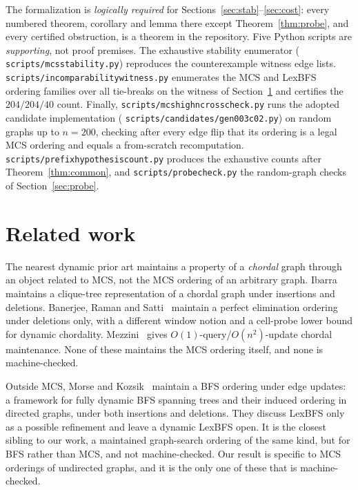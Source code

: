 \documentclass[11pt]{article}
\theoremstyle{definition}
\theoremstyle{remark}
\newcommand{\leanname}[1]{%
  \texttt{\begingroup\def\_{\textunderscore\allowbreak}#1\endgroup}}
\begin{document}
The formalization is \emph{logically required} for
Sections~\ref{sec:stab}--\ref{sec:cost}: every numbered theorem, corollary and
lemma there except Theorem~\ref{thm:probe}, and every certified obstruction, is
a theorem in the repository. Five Python scripts are \emph{supporting}, not proof
premises. The exhaustive stability enumerator
(\leanname{scripts/mcs\_stability.py}) reproduces the counterexample witness edge
lists. \leanname{scripts/incomparability\_witness.py} enumerates the MCS and
LexBFS ordering families over all tie-breaks on the witness of
Section~\ref{sec:related} and certifies the $204/204/40$ count. Finally,
\leanname{scripts/mcs\_highn\_crosscheck.py} runs the adopted candidate
implementation (\leanname{scripts/candidates/gen003\_c02.py}) on random graphs up
to $n=200$, checking after every edge flip that its ordering is a legal MCS
ordering and equals a from-scratch recomputation.
\leanname{scripts/prefix\_hypothesis\_count.py} produces the exhaustive counts
after Theorem~\ref{thm:common}, and \leanname{scripts/probe\_check.py} the
random-graph checks of Section~\ref{sec:probe}.

\section{Related work}
\label{sec:related}

The nearest dynamic prior art maintains a property of a \emph{chordal} graph
through an object related to MCS, not the MCS ordering of an arbitrary graph.
Ibarra~\cite{ibarra2008dynamic} maintains a clique-tree representation of a
chordal graph under insertions and deletions. Banerjee, Raman and
Satti~\cite{banerjee2018maintaining} maintain a perfect elimination ordering
under deletions only, with a different window notion and a cell-probe lower
bound for dynamic chordality. Mezzini~\cite{mezzini2012fully} gives
$O(1)$-query/$O(n^2)$-update chordal maintenance. None of these maintains the
MCS ordering itself, and none is machine-checked.

Outside MCS, Morse and Kozsik~\cite{morse2026bfs} maintain a BFS ordering under
edge updates: a framework for fully dynamic BFS spanning trees and their induced
ordering in directed graphs, under both insertions and deletions. They discuss
LexBFS only as a possible refinement and leave a dynamic LexBFS open. It is the
closest sibling to our work, a maintained graph-search ordering of the same
kind, but for BFS rather than MCS, and not machine-checked. Our result is specific to MCS
orderings of undirected graphs, and it is the only one of these that is
machine-checked.
\end{document}
